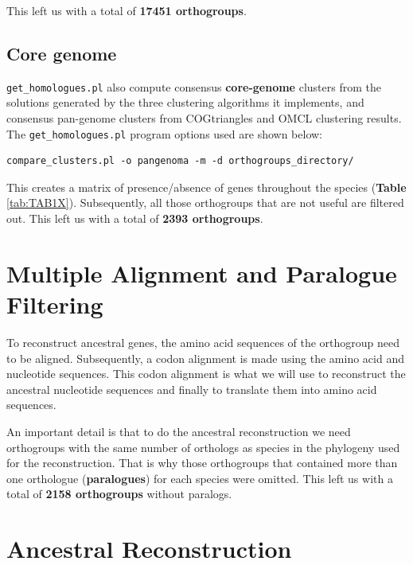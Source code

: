 \documentclass[
]{book}
\begin{document}
This left us with a total of \textbf{17451 orthogroups}.

\hypertarget{core-genome}{%
\subsection{Core genome}\label{core-genome}}

\texttt{get\_homologues.pl} also compute consensus \textbf{core-genome} clusters from the solutions generated by the three clustering algorithms it implements, and consensus pan-genome clusters from COGtriangles and OMCL clustering results. The \texttt{get\_homologues.pl} program options used are shown below:

\begin{verbatim}
compare_clusters.pl -o pangenoma -m -d orthogroups_directory/
\end{verbatim}

This creates a matrix of presence/absence of genes throughout the species (\textbf{Table} \ref{tab:TAB1X}). Subsequently, all those orthogroups that are not useful are filtered out. This left us with a total of \textbf{2393 orthogroups}.

\hypertarget{multiple-alignment-and-paralogue-filtering}{%
\section{Multiple Alignment and Paralogue Filtering}\label{multiple-alignment-and-paralogue-filtering}}

To reconstruct ancestral genes, the amino acid sequences of the orthogroup need to be aligned. Subsequently, a codon alignment is made using the amino acid and nucleotide sequences. This codon alignment is what we will use to reconstruct the ancestral nucleotide sequences and finally to translate them into amino acid sequences.

An important detail is that to do the ancestral reconstruction we need orthogroups with the same number of orthologs as species in the phylogeny used for the reconstruction. That is why those orthogroups that contained more than one orthologue (\textbf{paralogues}) for each species were omitted. This left us with a total of \textbf{2158 orthogroups} without paralogs.

\hypertarget{ancestral-reconstruction}{%
\section{Ancestral Reconstruction}\label{ancestral-reconstruction}}
\end{document}
